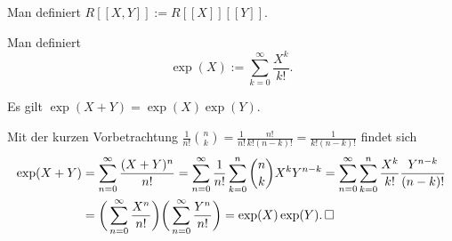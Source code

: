 \begin{Definition}\newlinefirst
Man definiert $R[[X,Y]]:=R[[X]][[Y]]$.
\end{Definition}

\begin{Definition}[Exponentialreihe] Man definiert
\[\exp(X) := \sum_{k=0}^\infty \frac{X^k}{k!}.\]
\end{Definition}

\begin{Korollar}
Es gilt $\exp(X+Y) = \exp(X)\exp(Y)$.
\end{Korollar}
\begin{Beweis}
Mit der kurzen Vorbetrachtung
$\frac{1}{n!}\binom{n}{k} = \frac{1}{n!}\frac{n!}{k!(n-k)!} = \frac{1}{k!(n-k)!}$
findet sich
\begin{align*}
\exp(X+Y) &= \sum_{n=0}^\infty\frac{(X+Y)^n}{n!}
= \sum_{n=0}^\infty\frac{1}{n!}\sum_{k=0}^n\binom{n}{k}X^k Y^{n-k}
= \sum_{n=0}^\infty\sum_{k=0}^n\frac{X^k}{k!}\frac{Y^{n-k}}{(n-k)!}\\
&= \bigg(\sum_{n=0}^\infty\frac{X^n}{n!}\bigg)
\bigg(\sum_{n=0}^\infty\frac{Y^n}{n!}\bigg)
= \exp(X)\exp(Y).\,\square
\end{align*}
\end{Beweis}

